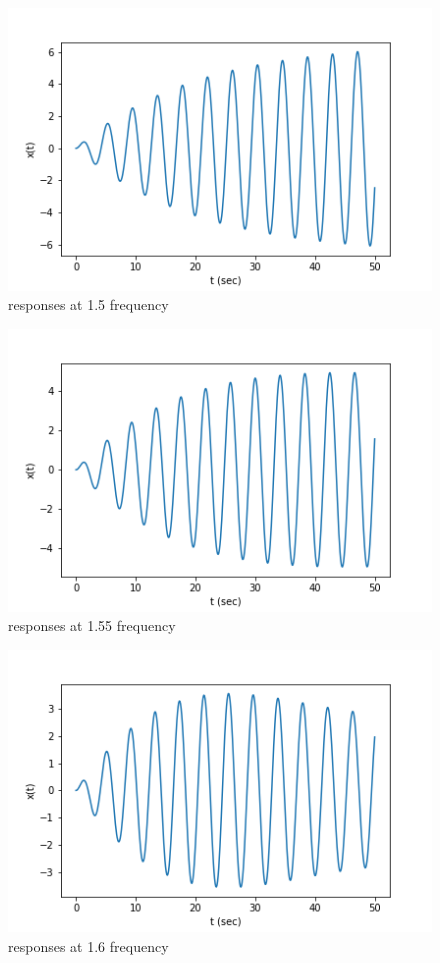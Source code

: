 \documentclass[11pt, a4paper]{article}
\begin{document}
\begin{figure}[!tbh]
  \centering
  \includegraphics[scale=0.5]{wvary1.5.png}
  \caption{responses at 1.5 frequency} 
  \label{fig:fig5}
\end{figure}
\begin{figure}[!tbh]
  \centering
  \includegraphics[scale=0.5]{wvary1.55.png}
  \caption{responses at 1.55 frequency} 
  \label{fig:fig6}
\end{figure}
\begin{figure}[!tbh]
  \centering
  \includegraphics[scale=0.5]{wvary1.6.png}
  \caption{responses at 1.6 frequency} 
  \label{fig:fig7}
\end{figure}
\end{document}
